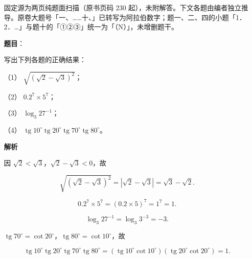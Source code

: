 

\begin{gktip}
固定源为两页纯题面扫描（原书页码 230 起），未附解答。下文各题由编者独立推导。原卷大题号「一、……十、」已转写为阿拉伯数字；题一、二、四的小题「1．2．…」与题十的「①②③」统一为「（N）」，未增删题干。
\end{gktip}

\begin{answer}

\textbf{题目}：

写出下列各题的正确结果：

（1） $\sqrt{\left(\sqrt{2}-\sqrt{3}\right)^{2}}$；

（2） $0.2^{7}\times5^{7}$；

（3） $\log_{3}27^{-1}$；

（4） $\operatorname{tg}10^{\circ}\operatorname{tg}20^{\circ}\operatorname{tg}70^{\circ}\operatorname{tg}80^{\circ}$。

\textbf{解析}


因 $\sqrt{2}<\sqrt{3}$，$\sqrt{2}-\sqrt{3}<0$，故

\nopagebreak[4]
\[
\sqrt{\left(\sqrt{2}-\sqrt{3}\right)^{2}}
=\left|\sqrt{2}-\sqrt{3}\right|
=\sqrt{3}-\sqrt{2}.
\]


\nopagebreak[4]
\[
0.2^{7}\times5^{7}=(0.2\times5)^{7}=1^{7}=1.
\]


\nopagebreak[4]
\[
\log_{3}27^{-1}=\log_{3}3^{-3}=-3.
\]


$\operatorname{tg}70^{\circ}=\cot20^{\circ}$，$\operatorname{tg}80^{\circ}=\cot10^{\circ}$，故

\nopagebreak[4]
\[
\operatorname{tg}10^{\circ}\operatorname{tg}20^{\circ}\operatorname{tg}70^{\circ}\operatorname{tg}80^{\circ}
=(\operatorname{tg}10^{\circ}\cot10^{\circ})(\operatorname{tg}20^{\circ}\cot20^{\circ})=1.
\]





\end{answer}
